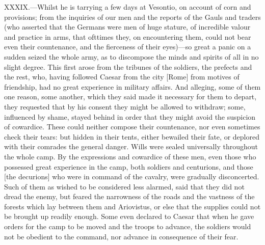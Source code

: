 XXXIX.—Whilst he is tarrying a few days at Vesontio, on account of corn
and provisions; from the inquiries of our men and the reports of the
Gauls and traders (who asserted that the Germans were men of huge
stature, of incredible valour and practice in arms, that ofttimes they,
on encountering them, could not bear even their countenance, and the
fierceness of their eyes)—so great a panic on a sudden seized the whole
army, as to discompose the minds and spirits of all in no slight degree.
This first arose from the tribunes of the soldiers, the prefects and the
rest, who, having followed Caesar from the city [Rome] from motives of
friendship, had no great experience in military affairs. And alleging,
some of them one reason, some another, which they said made it necessary
for them to depart, they requested that by his consent they might be
allowed to withdraw; some, influenced by shame, stayed behind in order
that they might avoid the suspicion of cowardice. These could neither
compose their countenance, nor even sometimes check their tears: but
hidden in their tents, either bewailed their fate, or deplored with
their comrades the general danger. Wills were sealed universally
throughout the whole camp. By the expressions and cowardice of these
men, even those who possessed great experience in the camp, both
soldiers and centurions, and those [the decurions] who were in command
of the cavalry, were gradually disconcerted. Such of them as wished to
be considered less alarmed, said that they did not dread the enemy, but
feared the narrowness of the roads and the vastness of the forests which
lay between them and Ariovistus, or else that the supplies could not be
brought up readily enough. Some even declared to Caesar that when he
gave orders for the camp to be moved and the troops to advance, the
soldiers would not be obedient to the command, nor advance in
consequence of their fear.

